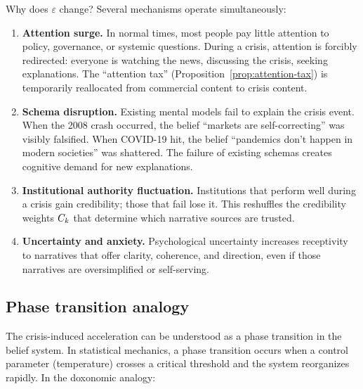Why does $\varepsilon$ change?
Several mechanisms operate simultaneously:

\begin{enumerate}
  \item \textbf{Attention surge.}
  In normal times, most people pay little attention to policy, governance, or systemic questions.
  During a crisis, attention is forcibly redirected: everyone is watching the news, discussing the crisis, seeking explanations.
  The ``attention tax'' (Proposition~\ref{prop:attention-tax}) is temporarily reallocated from commercial content to crisis content.

  \item \textbf{Schema disruption.}
  Existing mental models fail to explain the crisis event.
  When the 2008 crash occurred, the belief ``markets are self-correcting'' was visibly falsified.
  When COVID-19 hit, the belief ``pandemics don't happen in modern societies'' was shattered.
  The failure of existing schemas creates cognitive demand for new explanations.

  \item \textbf{Institutional authority fluctuation.}
  Institutions that perform well during a crisis gain credibility; those that fail lose it.
  This reshuffles the credibility weights $C_{k}$ that determine which narrative sources are trusted.

  \item \textbf{Uncertainty and anxiety.}
  Psychological uncertainty increases receptivity to narratives that offer clarity, coherence, and direction, even if those narratives are oversimplified or self-serving.
\end{enumerate}

\subsection{Phase transition analogy}

The crisis-induced acceleration can be understood as a phase transition in the belief system.
In statistical mechanics, a phase transition occurs when a control parameter (temperature) crosses a critical threshold and the system reorganizes rapidly.
In the doxonomic analogy:

